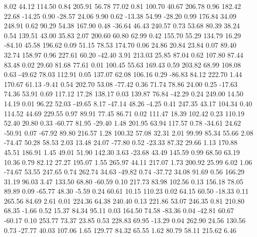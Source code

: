     8.02   44.12  114.50    0.84
  205.91   56.78   77.02    0.81
  100.70   40.67  206.78    0.96
  182.42   22.68  -14.25    0.90
  -28.57   24.06    9.90    0.62
  -13.38   54.99  -28.20    0.99
  176.84   34.09  248.91    0.62
   90.29   54.38  167.90    0.48
  -36.64   46.43  240.57    0.73
   53.68   80.39   38.24    0.54
  139.51   43.00   35.83    2.07
  200.60   60.80   62.99    0.42
  155.70   55.29  134.79   16.29
  -84.10   45.58  196.62    0.09
   51.15   78.53  174.70    0.06
   24.86   20.84   23.84    0.07
   89.40   32.74  158.97    0.96
  227.61   60.20  -42.40    3.91
  213.03   25.85   87.04    0.62
  107.80   87.44   83.48    0.02
   29.60   81.68   77.61    0.01
  100.45   55.63  169.43    0.59
  203.82   68.99  108.08    0.63
  -49.62   78.03  112.91    0.05
  137.07   62.08  106.16    0.29
  -86.83   84.12  222.70    1.44
  170.67   61.13   -9.41    0.54
  202.70   53.08  -77.42    0.36
   71.74   78.86   24.00    0.25
  -17.63   74.36   53.91    0.69
  117.12   17.28  138.17    0.03
  139.87   76.84  -42.29    0.24
  249.00   14.50   14.19    0.01
   96.22   52.03  -49.65    8.17
  -47.14   48.26   -4.25    0.41
  247.35   43.17  104.34    0.40
  114.52   44.69  229.55    0.97
   89.91   77.45   86.71    0.02
  111.47   18.39  102.42    0.23
  110.19   52.40   20.80    0.33
  -60.77   81.95  -29.40    1.48
  201.95   63.94  117.57    0.78
  -34.61   24.62  -50.91    0.07
  -67.92   89.80  216.57    1.28
  100.32   57.08   32.31    2.01
   99.99   85.34   55.66    2.08
  -74.47   50.28   58.53    2.03
   13.48   24.07  -77.80    0.52
  -23.33   87.32   29.66    1.13
  170.88   45.51  186.91    1.45
   49.01   51.90  142.30    3.63
  -23.68   43.49  145.59    0.99
   68.50   63.19   10.36    0.79
   82.12   27.27  195.07    1.55
  265.97   44.11  217.07    1.73
  200.92   25.99    6.02    1.06
  -74.67   53.55  247.65    0.74
  262.74   34.63  -49.82    0.74
  -37.72   34.08   91.69    0.56
  166.29   31.19   96.03    3.47
  133.50   68.80  -60.59    0.10
  217.73   83.98  102.56    0.13
  156.18   78.05   89.89    0.09
  -65.77   48.30   -5.59    0.24
   60.61   10.15  110.23    0.02
   64.15   60.50  -18.33    0.11
  265.56   84.69    2.61    0.01
  224.36   64.38  240.40    0.13
  221.86   53.07  246.35    0.81
  210.80   68.35   -1.66    0.52
   15.37   84.34   95.11    0.03
  164.50   74.58  -83.36    0.04
  -42.81   60.67  -60.17    0.10
  253.77   73.37   23.85    0.53
  228.83   69.95  -13.29    0.04
  262.90   24.56  130.56    0.73
  -27.77   40.03  107.06    1.65
  129.77   84.32   65.55    1.62
   80.79   58.11  215.62    6.46
